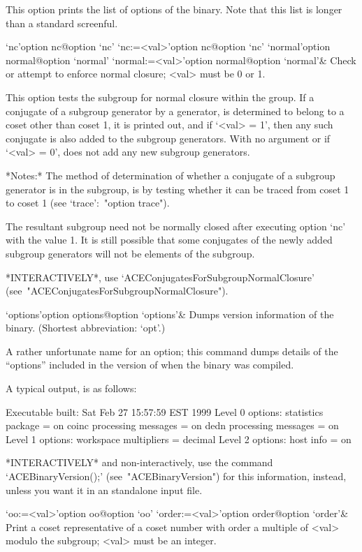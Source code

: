 This option prints the list of options of the {\ACE} binary. Note that
this list is longer than a standard screenful.

\>`nc'{option nc}@{option `nc'}
\>`nc:=<val>'{option nc}@{option `nc'}
\>`normal'{option normal}@{option `normal'}
\>`normal:=<val>'{option normal}@{option `normal'}&
Check or attempt to enforce normal closure; <val> must be 0 or 1.

This option tests the subgroup for normal closure within the group. If
a conjugate of a subgroup generator by a generator, is  determined  to
belong to a coset other than coset 1, it is printed out, and if `<val>
=  1',  then  any  such  conjugate  is  also  added  to  the  subgroup
generators. With no argument or if `<val> = 0', {\ACE}  does  not  add
any new subgroup generators.

*Notes:*
The method of determination of  whether  a  conjugate  of  a  subgroup
generator is in the subgroup, is by testing whether it can  be  traced
from coset 1 to coset 1  (see  `trace':~"option trace").

The resultant subgroup need not be  normally  closed  after  executing
option `nc'  with  the  value  1.  It  is  still  possible  that  some
conjugates of the newly added subgroup generators will not be elements
of the subgroup.

*INTERACTIVELY*,      use      `ACEConjugatesForSubgroupNormalClosure'
(see~"ACEConjugatesForSubgroupNormalClosure").

\>`options'{option options}@{option `options'}&
Dumps version information of the {\ACE} binary.
(Shortest abbreviation: `opt'.)

A rather unfortunate name for an option; this command dumps details of
the ``options'' included in the version  of  {\ACE}  when  the  {\ACE}
binary was compiled.

A typical output, is as follows:

\begintt
Executable built:
  Sat Feb 27 15:57:59 EST 1999
Level 0 options:
  statistics package = on
  coinc processing messages = on
  dedn processing messages = on
Level 1 options:
  workspace multipliers = decimal
Level 2 options:
  host info = on
\endtt

*INTERACTIVELY*    and    non-interactively,    use    the     command
`ACEBinaryVersion();' (see~"ACEBinaryVersion") for  this  information,
instead, unless you want it in an {\ACE} standalone input file.

\>`oo:=<val>'{option oo}@{option `oo'}
\>`order:=<val>'{option order}@{option `order'}&
Print a coset representative of a coset number with order  a  multiple
of <val> modulo the subgroup; <val> must be an integer.

